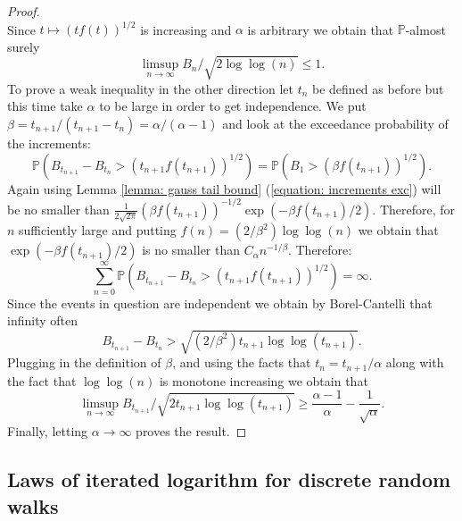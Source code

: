 \documentclass{article}
\begin{document}
\begin{proof}
\begin{equation}
\end{equation}
Since $t \mapsto \left ( t f(t) \right )^{1/2}$ is increasing and $\alpha$ is arbitrary we obtain that $\mathbb{P}$-almost surely
\begin{equation}
\limsup_{n \rightarrow \infty} B_n / \sqrt{2 \log \log (n)} \leq 1. 
\end{equation} 
To prove a weak inequality in the other direction let $t_n$ be defined as before but this time take $\alpha$ to be large in order to get independence. We put $\beta = t_{n+1} / (t_{n+1} - t_n ) = \alpha / (\alpha - 1)$ and look at the exceedance probability of the increments: 
\begin{equation}
\mathbb{P} \left ( B_{t_{n+1}} - B_{t_n} > \left ( t_{n+1} f (t_{n+1}) \right ) ^ {1/2} \right ) = \mathbb{P} \left ( B_1 > \left ( \beta f (t_{n+1}) \right ) ^ {1/2} \right ). 
\label{equation: increments exc}
\end{equation}
Again using Lemma \ref{lemma: gauss tail bound} (\ref{equation: increments exc}) will be no smaller than $\frac{1}{2\sqrt{2\pi}} \left ( \beta f (t_{n+1}) \right ) ^ {-1/2} \exp \left ( - \beta f \left ( t_{n+1} \right ) / 2 \right )$. Therefore, for $n$ sufficiently large and putting $f(n) = (2/\beta^2) \log \log (n)$ we obtain that $\exp \left ( - \beta f \left ( t_{n+1} \right ) / 2 \right )$ is no smaller than $C_\alpha n^{-1/\beta}$. Therefore: 
\begin{equation}
\sum_{n=0}^\infty \mathbb{P} \left ( B_{t_{n+1}} - B_{t_n} > \left ( t_{n+1} f (t_{n+1}) \right ) ^ {1/2} \right ) = \infty. 
\end{equation}
Since the events in question are independent we obtain by Borel-Cantelli that infinity often
\begin{equation}
B_{t_{n+1}} - B_{t_n} > \sqrt{\left ( 2 / \beta^2 \right ) t_{n+1} \log \log (t_{n+1})}. 
\end{equation}
Plugging in the definition of $\beta$, and using the facts that $t_n = t_{n+1} / \alpha$ along with the fact that $\log \log (n)$ is monotone increasing we obtain that 
\begin{equation}
\limsup_{n \rightarrow \infty} B_{t_{n+1}} / \sqrt{2 t_{n+1} \log \log (t_{n+1})} \geq \frac{\alpha-1}{\alpha} - \frac{1}{\sqrt{\alpha}}. 
\end{equation}
Finally, letting $\alpha \rightarrow \infty$ proves the result. 
\end{proof}

\subsection{Laws of iterated logarithm for discrete random walks} \label{section: laws of iterated logarithm for discrete random walks}
\end{document}
